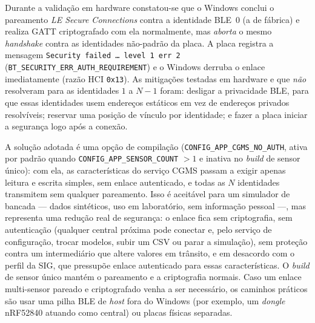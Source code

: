 Durante a validação em hardware constatou-se que o Windows conclui o
pareamento \textit{LE Secure Connections} contra a identidade BLE~0 (a de
fábrica) e realiza GATT criptografado com ela normalmente, mas \emph{aborta}
o mesmo \textit{handshake} contra as identidades não-padrão da placa. A placa
registra a mensagem \texttt{Security failed \ldots\ level 1 err 2}
(\texttt{BT\_SECURITY\_ERR\_AUTH\_REQUIREMENT}) e o Windows derruba o enlace
imediatamente (razão HCI \texttt{0x13}). As mitigações testadas em hardware e
que \emph{não} resolveram para as identidades $1$ a $N-1$ foram: desligar a
privacidade BLE, para que essas identidades usem endereços estáticos em vez
de endereços privados resolvíveis; reservar uma posição de vínculo por
identidade; e fazer a placa iniciar a segurança logo após a conexão.

A solução adotada é uma opção de compilação
(\texttt{CONFIG\_APP\_CGMS\_NO\_AUTH}, ativa por padrão quando
\texttt{CONFIG\_APP\_SENSOR\_COUNT} $> 1$ e inativa no \textit{build} de
sensor único): com ela, as características do serviço CGMS passam a exigir
apenas leitura e escrita simples, sem enlace autenticado, e todas as $N$
identidades transmitem sem qualquer pareamento. Isso é aceitável para um
simulador de bancada --- dados sintéticos, uso em laboratório, sem informação
pessoal ---, mas representa uma redução real de segurança: o enlace fica sem
criptografia, sem autenticação (qualquer central próxima pode conectar e,
pelo serviço de configuração, trocar modelos, subir um CSV ou parar a
simulação), sem proteção contra um intermediário que altere valores em
trânsito, e em desacordo com o perfil da SIG, que pressupõe enlace
autenticado para essas características. O \textit{build} de sensor único
mantém o pareamento e a criptografia normais. Caso um enlace multi-sensor
pareado e criptografado venha a ser necessário, os caminhos práticos são usar
uma pilha BLE de \textit{host} fora do Windows (por exemplo, um \textit{dongle}
nRF52840 atuando como central) ou placas físicas separadas.
